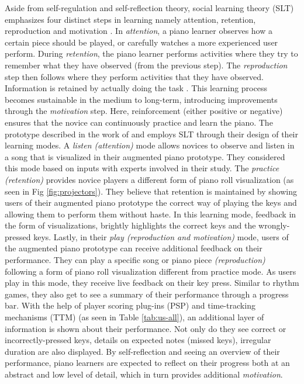 \documentclass[sigconf, screen, review]{acmart}
\begin{document}
Aside from self-regulation and self-reflection theory, social learning theory (SLT) emphasizes four distinct steps in learning namely attention, retention, reproduction and motivation \cite{bandura1977social}. In \textit{attention}, a piano learner observes how a certain piece should be played, or carefully watches a more experienced user perform. During \textit{retention}, the piano learner performs activities where they try to remember what they have observed (from the previous step). The \textit{reproduction} step then follows where they perform activities that they have observed. Information is retained by actually doing the task \cite{stryker1997content}. This learning process becomes sustainable in the medium to long-term, introducing improvements through the \textit{motivation} step. Here, reinforcement (either positive or negative) ensures that the novice can continuously practice and learn the piano. The prototype described in the work of \citet{weing2013piano} and \citet{rogers2014piano} employs SLT through their design of their learning modes. A \textit{listen (attention)} mode allows novices to observe and listen in a song that is visualized in their augmented piano prototype. They considered this mode based on inputs with experts involved in their study. The \textit{practice (retention)} provides novice players a different form of piano roll visualization (as seen in Fig \ref{fig:projectors}). They believe that retention is maintained by showing users of their augmented piano prototype the correct way of playing the keys and allowing them to perform them without haste. In this learning mode, feedback in the form of visualizations, brightly highlights the correct keys and the wrongly-pressed keys. Lastly, in their \textit{play (reproduction and motivation)} mode, users of the augmented piano prototype can receive additional feedback on their performance. They can play a specific song or piano piece \textit{(reproduction)} following a form of piano roll visualization different from practice mode. As users play in this mode, they receive live feedback on their key press. Similar to rhythm games, they also get to see a summary of their performance through a progress bar. With the help of player scoring plug-ins (PSP) and time-tracking mechanisms (TTM) (as seen in Table \ref{tab:us-all}), an additional layer of information is shown about their performance. Not only do they see correct or incorrectly-pressed keys, details on expected notes (missed keys), irregular duration are also displayed. By self-reflection and seeing an overview of their performance, piano learners are expected to reflect on their progress both at an abstract and low level of detail, which in turn provides additional \textit{motivation}. 
\end{document}
